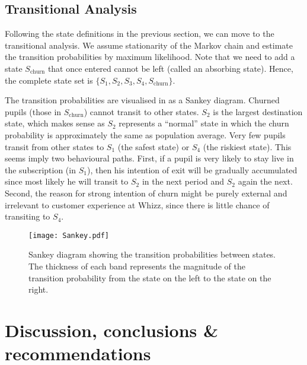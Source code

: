 \documentclass[english,a4,oneside,9pt]{extarticle}
\begin{document}
\vspace*{-3mm}
\subsection*{Transitional Analysis}

Following the state definitions in the previous section, we can move to the transitional analysis. We assume stationarity of the Markov chain and estimate the transition probabilities by maximum likelihood. Note that we need to add a state $S_\text{churn}$ that once entered cannot be left (called an absorbing state). Hence, the complete state set is $\{S_1, S_2, S_3, S_4, S_\text{churn}\}$.

The transition probabilities are visualised in  as a Sankey diagram. Churned pupils (those in $S_\text{churn}$) cannot transit to other states. $S_2$ is the largest destination state, which makes sense as $S_2$ represents a ``normal'' state in which the churn probability is approximately the same as population average. Very few pupils transit from other states to $S_1$ (the safest state) or $S_4$ (the riskiest state). This seems imply two behavioural paths. First, if a pupil is very likely to stay live in the subscription (in $S_1$), then his intention of exit will be gradually accumulated since most likely he will transit to $S_2$ in the next period and $S_2$ again the next. Second, the reason for strong intention of churn might be purely external and irrelevant to customer experience at Whizz, since there is little chance of transiting to $S_4$.


\begin{figure}[htb]
\centering
\texttt{[image: Sankey.pdf]}
\caption{Sankey diagram showing the transition probabilities between states. The thickness of each band represents the magnitude of the transition probability from the state on the left to the state on the right.}
\label{fig:sankey}
\end{figure}

\vspace*{-5mm}
\section{Discussion, conclusions \& recommendations}
\end{document}
